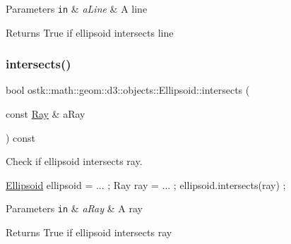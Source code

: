 \begin{DoxyParams}[1]{Parameters}
\mbox{\tt in}  & {\em a\+Line} & A line \\
\hline
\end{DoxyParams}
\begin{DoxyReturn}{Returns}
True if ellipsoid intersects line 
\end{DoxyReturn}
\mbox{\label{classostk_1_1math_1_1geom_1_1d3_1_1objects_1_1_ellipsoid_aa12b5c24a22e121b18c3022ce0534a29}} 
\subsubsection{\texorpdfstring{intersects()}{intersects()}\hspace{0.1cm}{\footnotesize\ttfamily [4/10]}}
{\footnotesize\ttfamily bool ostk\+::math\+::geom\+::d3\+::objects\+::\+Ellipsoid\+::intersects (\begin{DoxyParamCaption}\item[{const \hyperlink{classostk_1_1math_1_1geom_1_1d3_1_1objects_1_1_ray}{Ray} \&}]{a\+Ray }\end{DoxyParamCaption}) const}



Check if ellipsoid intersects ray. 


\begin{DoxyCode}
\hyperlink{classostk_1_1math_1_1geom_1_1d3_1_1objects_1_1_ellipsoid_a106c71abf9503f3d06b2613c1c7e9d65}{Ellipsoid} ellipsoid = ... ;
Ray ray = ... ;
ellipsoid.intersects(ray) ;
\end{DoxyCode}



\begin{DoxyParams}[1]{Parameters}
\mbox{\tt in}  & {\em a\+Ray} & A ray \\
\hline
\end{DoxyParams}
\begin{DoxyReturn}{Returns}
True if ellipsoid intersects ray 
\end{DoxyReturn}
\mbox{\label{classostk_1_1math_1_1geom_1_1d3_1_1objects_1_1_ellipsoid_ac7fc0339626b86b044d3c1a8fc174211}} 
